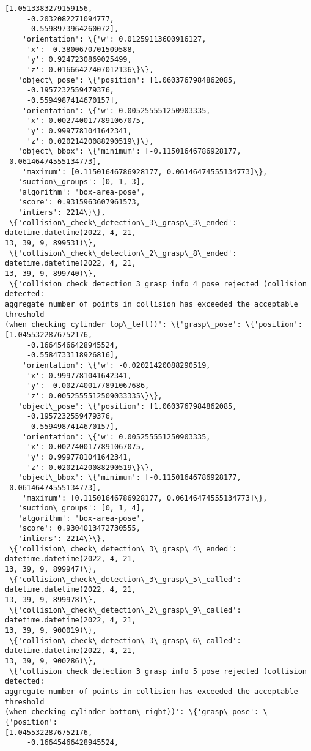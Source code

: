 \documentclass[11pt]{article}
\begin{document}
\begin{tcolorbox}[breakable, size=fbox, boxrule=.5pt, pad at break*=1mm, opacityfill=0]
\begin{Verbatim}[commandchars=\\\{\}]
[1.0513383279159156,
     -0.2032082271094777,
     -0.5598973964260072],
    'orientation': \{'w': 0.01259113600916127,
     'x': -0.3800670701509588,
     'y': 0.9247230869025499,
     'z': 0.01666427407012136\}\},
   'object\_pose': \{'position': [1.0603767984862085,
     -0.1957232559479376,
     -0.5594987414670157],
    'orientation': \{'w': 0.005255551250903335,
     'x': 0.0027400177891067075,
     'y': 0.9997781041642341,
     'z': 0.02021420088290519\}\},
   'object\_bbox': \{'minimum': [-0.11501646786928177, -0.06146474555134773],
    'maximum': [0.11501646786928177, 0.06146474555134773]\},
   'suction\_groups': [0, 1, 3],
   'algorithm': 'box-area-pose',
   'score': 0.9315963607961573,
   'inliers': 2214\}\},
 \{'collision\_check\_detection\_3\_grasp\_3\_ended': datetime.datetime(2022, 4, 21,
13, 39, 9, 899531)\},
 \{'collision\_check\_detection\_2\_grasp\_8\_ended': datetime.datetime(2022, 4, 21,
13, 39, 9, 899740)\},
 \{'collision check detection 3 grasp info 4 pose rejected (collision detected:
aggregate number of points in collision has exceeded the acceptable threshold
(when checking cylinder top\_left))': \{'grasp\_pose': \{'position':
[1.0455322876752176,
     -0.16645466428945524,
     -0.5584733118926816],
    'orientation': \{'w': -0.02021420088290519,
     'x': 0.9997781041642341,
     'y': -0.0027400177891067686,
     'z': 0.0052555512509033335\}\},
   'object\_pose': \{'position': [1.0603767984862085,
     -0.1957232559479376,
     -0.5594987414670157],
    'orientation': \{'w': 0.005255551250903335,
     'x': 0.0027400177891067075,
     'y': 0.9997781041642341,
     'z': 0.02021420088290519\}\},
   'object\_bbox': \{'minimum': [-0.11501646786928177, -0.06146474555134773],
    'maximum': [0.11501646786928177, 0.06146474555134773]\},
   'suction\_groups': [0, 1, 4],
   'algorithm': 'box-area-pose',
   'score': 0.9304013472730555,
   'inliers': 2214\}\},
 \{'collision\_check\_detection\_3\_grasp\_4\_ended': datetime.datetime(2022, 4, 21,
13, 39, 9, 899947)\},
 \{'collision\_check\_detection\_3\_grasp\_5\_called': datetime.datetime(2022, 4, 21,
13, 39, 9, 899978)\},
 \{'collision\_check\_detection\_2\_grasp\_9\_called': datetime.datetime(2022, 4, 21,
13, 39, 9, 900019)\},
 \{'collision\_check\_detection\_3\_grasp\_6\_called': datetime.datetime(2022, 4, 21,
13, 39, 9, 900286)\},
 \{'collision check detection 3 grasp info 5 pose rejected (collision detected:
aggregate number of points in collision has exceeded the acceptable threshold
(when checking cylinder bottom\_right))': \{'grasp\_pose': \{'position':
[1.0455322876752176,
     -0.16645466428945524,

\end{Verbatim}
\end{tcolorbox}
\end{document}
